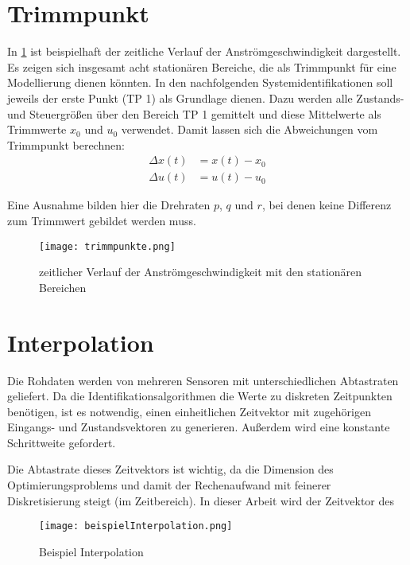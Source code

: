 \section{Trimmpunkt} %
In \cref{fig:trimmpunkte} ist beispielhaft der zeitliche Verlauf der Anströmgeschwindigkeit dargestellt. Es zeigen sich 
insgesamt acht stationären Bereiche, die als Trimmpunkt für eine Modellierung dienen könnten. In den nachfolgenden 
Systemidentifikationen soll jeweils der erste Punkt (TP 1) als Grundlage dienen. Dazu werden alle Zustands- und Steuergrößen 
über den Bereich TP 1 gemittelt und diese Mittelwerte als Trimmwerte $ x_0 $ und $ u_0 $ verwendet. Damit lassen sich die 
Abweichungen vom Trimmpunkt berechnen:
\begin{equation}
	\begin{split}
		\Delta x(t) &= x(t)-x_0\\
		\Delta u(t) &= u(t)-u_0
	\end{split}
\end{equation}

Eine Ausnahme bilden hier die Drehraten $ p $, $ q $ und $ r $, bei denen keine Differenz zum Trimmwert gebildet werden muss.


\begin{figure}[h!]
	\centering
	\texttt{[image: trimmpunkte.png]}
	\caption{zeitlicher Verlauf der Anströmgeschwindigkeit mit den stationären Bereichen}
	\label{fig:trimmpunkte}
\end{figure}




\section{Interpolation} %
Die Rohdaten werden von mehreren Sensoren mit unterschiedlichen Abtastraten geliefert. Da die Identifikationsalgorithmen die 
Werte zu diskreten Zeitpunkten benötigen, ist es notwendig, einen einheitlichen Zeitvektor mit zugehörigen Eingangs- und 
Zustandsvektoren zu generieren. Außerdem wird eine konstante Schrittweite gefordert.\par
Die Abtastrate dieses Zeitvektors ist wichtig, da die Dimension des Optimierungsproblems und damit der 
Rechenaufwand mit feinerer Diskretisierung steigt (im Zeitbereich). In dieser Arbeit wird der Zeitvektor des 

\begin{figure}[h!]
	\centering
	\texttt{[image: beispielInterpolation.png]}
	\caption{Beispiel Interpolation}
	\label{fig:interpBsp}
\end{figure}

